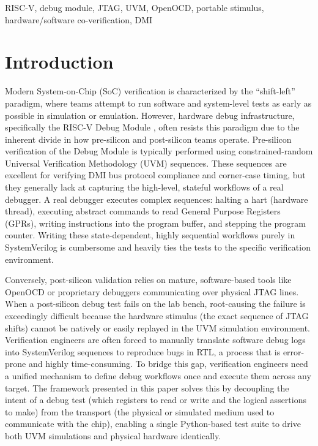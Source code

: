\documentclass[conference]{IEEEtran}
\begin{document}
\begin{IEEEkeywords}
RISC-V, debug module, JTAG, UVM, OpenOCD, portable stimulus, hardware/software co-verification, DMI
\end{IEEEkeywords}

\section{Introduction}

Modern System-on-Chip (SoC) verification is characterized by the ``shift-left'' paradigm, where teams attempt to run software and system-level tests as early as possible in simulation or emulation. However, hardware debug infrastructure, specifically the RISC-V Debug Module \cite{riscv-debug-spec}, often resists this paradigm due to the inherent divide in how pre-silicon and post-silicon teams operate. Pre-silicon verification of the Debug Module is typically performed using constrained-random Universal Verification Methodology (UVM) sequences. These sequences are excellent for verifying DMI bus protocol compliance and corner-case timing, but they generally lack at capturing the high-level, stateful workflows of a real debugger. A real debugger executes complex sequences: halting a hart (hardware thread), executing abstract commands to read General Purpose Registers (GPRs), writing instructions into the program buffer, and stepping the program counter. Writing these state-dependent, highly sequential workflows purely in SystemVerilog is cumbersome and heavily ties the tests to the specific verification environment.

Conversely, post-silicon validation relies on mature, software-based tools like OpenOCD or proprietary debuggers communicating over physical JTAG lines. When a post-silicon debug test fails on the lab bench, root-causing the failure is exceedingly difficult because the hardware stimulus (the exact sequence of JTAG shifts) cannot be natively or easily replayed in the UVM simulation environment. Verification engineers are often forced to manually translate software debug logs into SystemVerilog sequences to reproduce bugs in RTL, a process that is error-prone and highly time-consuming. To bridge this gap, verification engineers need a unified mechanism to define debug workflows once and execute them across any target. The framework presented in this paper solves this by decoupling the intent of a debug test (which registers to read or write and the logical assertions to make) from the transport (the physical or simulated medium used to communicate with the chip), enabling a single Python-based test suite to drive both UVM simulations and physical hardware identically.
\end{document}
